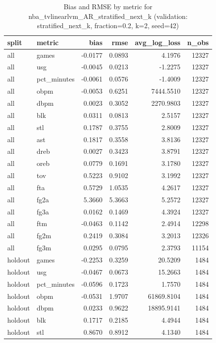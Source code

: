 \begin{table}
\caption{Bias and RMSE by metric for nba_tvlinearlvm_AR_stratified_next_k (validation: stratified_next_k, fraction=0.2, k=2, seed=42)}
\label{tab:nba_tvlinearlvm_AR_stratified_next_k_vs_stratified_next_k_f20_k2_s42_bias_rmse}
\begin{tabular}{llrrrr}
\toprule
split & metric & bias & rmse & avg\_log\_loss & n\_obs \\
\midrule
all & games & -0.0177 & 0.0893 & 4.1976 & 12327 \\
all & usg & -0.0045 & 0.0213 & -1.2275 & 12327 \\
all & pct\_minutes & -0.0061 & 0.0576 & -1.4009 & 12327 \\
all & obpm & -0.0053 & 0.6251 & 7444.5510 & 12327 \\
all & dbpm & 0.0023 & 0.3052 & 2270.9803 & 12327 \\
all & blk & 0.0311 & 0.0813 & 2.5157 & 12327 \\
all & stl & 0.1787 & 0.3755 & 2.8009 & 12327 \\
all & ast & 0.1817 & 0.3558 & 3.8136 & 12327 \\
all & dreb & 0.0027 & 0.3423 & 3.8791 & 12327 \\
all & oreb & 0.0779 & 0.1691 & 3.1780 & 12327 \\
all & tov & 0.5223 & 0.9102 & 3.1992 & 12327 \\
all & fta & 0.5729 & 1.0535 & 4.2617 & 12327 \\
all & fg2a & 5.3660 & 5.3663 & 5.2572 & 12327 \\
all & fg3a & 0.0162 & 0.1469 & 4.3924 & 12327 \\
all & ftm & -0.0463 & 0.1142 & 2.4914 & 12298 \\
all & fg2m & 0.2419 & 0.3084 & 3.2013 & 12326 \\
all & fg3m & 0.0295 & 0.0795 & 2.3793 & 11154 \\
holdout & games & -0.2253 & 0.3259 & 20.5209 & 1484 \\
holdout & usg & -0.0467 & 0.0673 & 15.2663 & 1484 \\
holdout & pct\_minutes & -0.0596 & 0.1723 & 1.7570 & 1484 \\
holdout & obpm & -0.0531 & 1.9707 & 61869.8104 & 1484 \\
holdout & dbpm & 0.0233 & 0.9622 & 18895.9141 & 1484 \\
holdout & blk & 0.1717 & 0.2185 & 4.4944 & 1484 \\
holdout & stl & 0.8670 & 0.8912 & 4.1340 & 1484 \\

\end{tabular}
\end{table}
